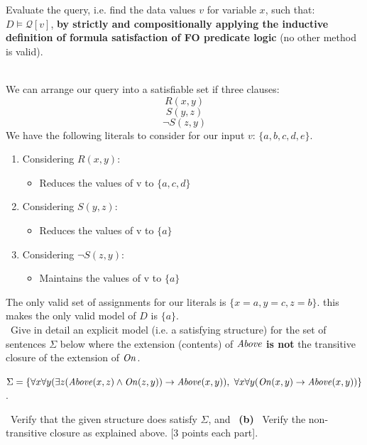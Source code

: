 \documentclass[12pt,fullpage]{article}
\newcommand{\nit}[1]{{\it #1}}
\begin{document}
\vspace*{2mm}
Evaluate the query, i.e. find the data values $v$ for variable $x$, such that: \ $D \models \mathcal{Q}[v]$, {\bf by strictly and compositionally applying the inductive definition of formula satisfaction of 
FO predicate logic} (no other method is valid).

\vspace{2mm} \\
We can arrange our query into a satisfiable set if three clauses:
$$R(x,y)$$
$$S(y,z)$$
$$\neg S(z,y)$$
We have the following literals to consider for our input $v$: $\{a,b,c,d,e\}$.
\begin{enumerate}
\item Considering $R(x,y)$:
\begin{itemize}
\item Reduces the values of v to $\{a,c,d\}$
\end{itemize}
\item Considering $S(y,z)$:
\begin{itemize}
\item Reduces the values of v to $\{a\}$
\end{itemize}
\item Considering $\neg S(z,y)$:
\begin{itemize}
\item Maintains the values of v to $\{a\}$
\end{itemize}
\end{enumerate}
The only valid set of assignments for our literals is $\{x=a,y=c,z=b\}$. this makes the only valid model of $D$ is $\{a\}$.\\

 \ Give in detail an explicit   model (i.e. a satisfying structure) for the set of sentences $\Sigma$ below where the extension (contents) of
$\nit{Above}$ {\bf is not} the transitive closure of the extension of $\nit{On}$.

$\Sigma = \{\forall x \forall y (\exists z
(\nit{Above}(x,z) \wedge
\nit{On}(z,y)) \rightarrow \nit{Above}(x,y)), \  \forall x \forall y
(\nit{On}(x,y) \rightarrow
\nit{Above}(x,y))\}$.

 \ Verify that the given structure does satisfy $\Sigma$, and \ {\bf (b)} \ Verify the non-transitive closure as explained above. \hfill [3 points each part]. \\
\end{document}
